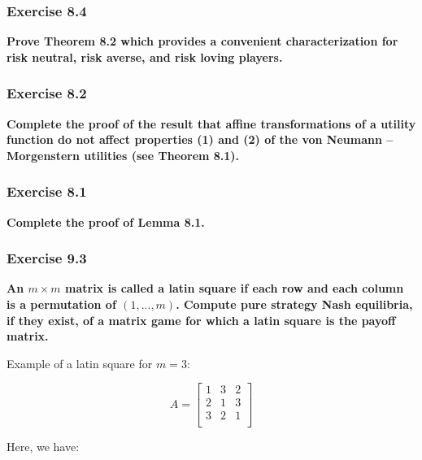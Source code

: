 \documentclass[12pt, a4paper]{article}
\begin{document}
\subsubsection*{Exercise 8.4}

\textbf{Prove Theorem 8.2 which provides a convenient characterization for risk neutral,
risk averse, and risk loving players.}


\subsubsection*{Exercise 8.2}

\textbf{Complete the proof of the result that affine transformations of a utility function do not affect properties (1) and (2) of the von Neumann – Morgenstern utilities (see Theorem 8.1).}


\subsubsection*{Exercise 8.1}

\textbf{Complete the proof of Lemma 8.1.}


\subsubsection*{Exercise 9.3}

\textbf{An $m \times m$ matrix is called a latin square if each row and each column is a permutation of $(1, . . . , m)$. Compute pure strategy Nash equilibria, if they exist, of a matrix game for which a latin square is the payoff matrix.}

Example of a latin square for $m=3$:

\begin{equation*}
    A = 
    \begin{bmatrix}
        1 & 3 & 2 \\
        2 & 1 & 3 \\
        3 & 2 & 1 \\
    \end{bmatrix}
\end{equation*}

Here, we have:
\end{document}
